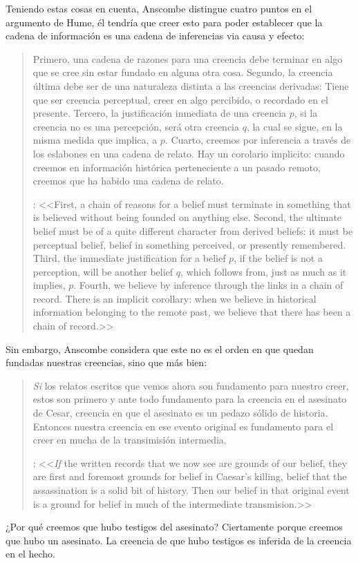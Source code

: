 Teniendo estas cosas en cuenta, Anscombe distingue cuatro puntos en el argumento de Hume, él tendría que creer esto para poder establecer que la cadena de información es una cadena de inferencias via causa y efecto: \blockquote[{\cite[88]{anscombe1981parmenides:humeandjulius}}: <<First, a chain of reasons for a belief must terminate in something that is believed without being founded on anything else. Second, the ultimate belief must be of a quite different character from derived beliefs: it must be perceptual belief, belief in something perceived, or presently remembered. Third, the immediate justification for a belief $p$, if the belief is not a perception, will be another belief $q$, which follows from, just as much as it implies, $p$. Fourth, we believe by inference through the links in a chain of record.   There is an implicit corollary: when we believe in historical information belonging to the remote past, we believe that there has been a chain of record.>>]{Primero, una cadena de razones para una creencia debe terminar en algo que se cree sin estar fundado en alguna otra cosa. Segundo, la creencia última debe ser de una naturaleza distinta a las creencias derivadas: Tiene que ser creencia perceptual, creer en algo percibido, o recordado en el presente. Tercero, la justificación inmediata de una creencia $p$, si la creencia no es una percepción, será otra creencia $q$, la cual se sigue, en la misma medida que implica, a $p$. Cuarto, creemos por inferencia a través de los eslabones en una cadena de relato. Hay un corolario implicito: cuando creemos en información histórica perteneciente a un pasado remoto, creemos que ha habido una cadena de relato.}

Sin embargo, Anscombe considera que este no es el orden en que quedan fundadas nuestras creencias, sino que más bien: \blockquote[{\cite[88]{anscombe1981parmenides:humeandjulius}}: <<\emph{If} the written records that we now see are grounds of our belief, they are first and foremost grounds for belief in Caesar's killing, belief that the assassination is a solid bit of history. Then our belief in that original event is a ground for belief in much of the intermediate transmision.>>]{\emph{Si} los relatos escritos que vemos ahora son fundamento para nuestro creer, estos son primero y ante todo fundamento para la creencia en el asesinato de Cesar, creencia en que el asesinato es un pedazo sólido de historia. Entonces nuestra creencia en ese evento original es fundamento para el creer en mucha de la transimisión intermedia.} ¿Por qué creemos que hubo testigos del asesinato? Ciertamente porque creemos que hubo un asesinato. La creencia de que hubo testigos es inferida de la creencia en el hecho.

